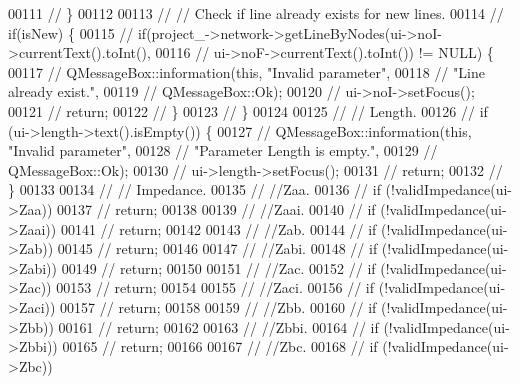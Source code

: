 \begin{DoxyCode}
00111 \textcolor{comment}{//  \}}
00112 
00113 \textcolor{comment}{//  // Check if line already exists for new lines.}
00114 \textcolor{comment}{//  if(isNew) \{}
00115 \textcolor{comment}{//    if(project\_->network->getLineByNodes(ui->noI->currentText().toInt(),}
00116 \textcolor{comment}{//                                         ui->noF->currentText().toInt()) != NULL) \{}
00117 \textcolor{comment}{//      QMessageBox::information(this, "Invalid parameter",}
00118 \textcolor{comment}{//                               "Line already exist.",}
00119 \textcolor{comment}{//                               QMessageBox::Ok);}
00120 \textcolor{comment}{//      ui->noI->setFocus();}
00121 \textcolor{comment}{//      return;}
00122 \textcolor{comment}{//    \}}
00123 \textcolor{comment}{//  \}}
00124 
00125 \textcolor{comment}{//  // Length.}
00126 \textcolor{comment}{//  if (ui->length->text().isEmpty()) \{}
00127 \textcolor{comment}{//    QMessageBox::information(this, "Invalid parameter",}
00128 \textcolor{comment}{//                             "Parameter Length is empty.",}
00129 \textcolor{comment}{//                             QMessageBox::Ok);}
00130 \textcolor{comment}{//    ui->length->setFocus();}
00131 \textcolor{comment}{//    return;}
00132 \textcolor{comment}{//  \}}
00133 
00134 \textcolor{comment}{//  // Impedance.}
00135 \textcolor{comment}{//  //Zaa.}
00136 \textcolor{comment}{//  if (!validImpedance(ui->Zaa))}
00137 \textcolor{comment}{//    return;}
00138 
00139 \textcolor{comment}{//  //Zaai.}
00140 \textcolor{comment}{//  if (!validImpedance(ui->Zaai))}
00141 \textcolor{comment}{//    return;}
00142 
00143 \textcolor{comment}{//  //Zab.}
00144 \textcolor{comment}{//  if (!validImpedance(ui->Zab))}
00145 \textcolor{comment}{//    return;}
00146 
00147 \textcolor{comment}{//  //Zabi.}
00148 \textcolor{comment}{//  if (!validImpedance(ui->Zabi))}
00149 \textcolor{comment}{//    return;}
00150 
00151 \textcolor{comment}{//  //Zac.}
00152 \textcolor{comment}{//  if (!validImpedance(ui->Zac))}
00153 \textcolor{comment}{//    return;}
00154 
00155 \textcolor{comment}{//  //Zaci.}
00156 \textcolor{comment}{//  if (!validImpedance(ui->Zaci))}
00157 \textcolor{comment}{//    return;}
00158 
00159 \textcolor{comment}{//  //Zbb.}
00160 \textcolor{comment}{//  if (!validImpedance(ui->Zbb))}
00161 \textcolor{comment}{//    return;}
00162 
00163 \textcolor{comment}{//  //Zbbi.}
00164 \textcolor{comment}{//  if (!validImpedance(ui->Zbbi))}
00165 \textcolor{comment}{//    return;}
00166 
00167 \textcolor{comment}{//  //Zbc.}
00168 \textcolor{comment}{//  if (!validImpedance(ui->Zbc))}

\end{DoxyCode}
